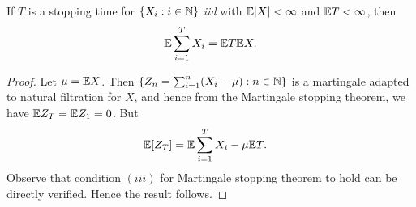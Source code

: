 \documentclass[a4paper,10pt,english]{article}
\begin{document}
\begin{cor} 
If $T$ is a stopping time for $\{X_i: i \in \mathbb{N}\}$ \textit{iid} with $\mathbb{E}|X|< \infty$ and $\mathbb{E} T < \infty$, then
\begin{align*}
\mathbb{E}\sum_{i=1}^{T}X_i =\mathbb{E} T\mathbb{E} X.
\end{align*}
\end{cor}
\begin{proof}
Let $\mu=\mathbb{E} X$. Then $\{Z_n = \sum_{i=1}^{n}(X_i-\mu): n \in \mathbb{N}\}$ is a martingale adapted to natural filtration for $X$,  and hence from the Martingale stopping theorem, we have $\mathbb{E} Z_T =\mathbb{E} Z_1=0$. 
But 
\begin{align*}
\E[Z_T] %
&=\E\sum_{i=1}^T X_i- \mu\E T.
\end{align*}
Observe that condition $(iii)$  for Martingale stopping theorem to hold can be directly verified. 
Hence the result follows. 
\end{proof}
\end{document}
